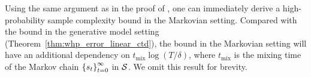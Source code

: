 \begin{remark}
Using the same argument as in the proof of \citep[Theorem~6][]{samsonov2024improved}, one can immediately derive a high-probability sample complexity bound in the Markovian setting.
Compared with the bound in the generative model setting (Theorem~\ref{thm:whp_error_linear_ctd}), the bound in the Markovian setting will have an additional dependency on $t_{\operatorname{mix}}\log(T/\delta)$, where $t_{\operatorname{mix}}$ is the mixing time of the Markov chain $\left\{{s_t}\right\}_{t=0}^{\infty}$ in ${\mathcal{S}}$.
We omit this result for brevity.
\end{remark}



